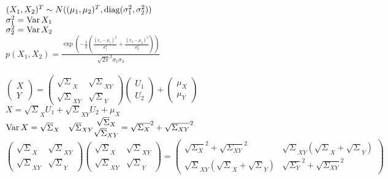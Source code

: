 \documentclass[12pt]{article}
\begin{document}
$(X_1, X_2)^T \sim N((\mu_1, \mu_2)^T, \operatorname{diag}(\sigma_1^2, \sigma_2^2))$\\
$\sigma_1^2 = \operatorname{Var} X_1$\\
$\sigma_2^2 = \operatorname{Var} X_2$\\
$p(X_1, X_2) = \frac{\exp(-\frac12 (\frac{(x_1 - \mu_1)^2}{\sigma_1^2} + \frac{(x_2 - \mu_2)^2}{\sigma_2^2}))}{\sqrt{2\pi}^2 \sigma_1 \sigma_2}$\\\\
$\begin{pmatrix}
    X\\Y
\end{pmatrix} = \begin{pmatrix}
    \sqrt{\Sigma}_X & \sqrt{\Sigma}_{XY}\\
    \sqrt{\Sigma}_{XY} & \sqrt{\Sigma}_Y
\end{pmatrix}\begin{pmatrix}
    U_1\\U_2
\end{pmatrix} + \begin{pmatrix}
    \mu_X\\\mu_Y
\end{pmatrix}$\\
$X = \sqrt{\Sigma}_X U_1 + \sqrt{\Sigma}_{XY}U_2 + \mu_X$\\
$\operatorname{Var} X = \begin{matrix}
    \sqrt{\Sigma}_X & \sqrt{\Sigma}_{XY}
\end{matrix}\begin{matrix}
    \sqrt{\Sigma}_X\\
    \sqrt{\Sigma}_{XY}
\end{matrix} = \sqrt{\Sigma_X}^2 + \sqrt{\Sigma_{XY}}^2$\\
$\begin{pmatrix}
    \sqrt{\Sigma}_X & \sqrt{\Sigma}_{XY}\\
    \sqrt{\Sigma}_{XY} & \sqrt{\Sigma}_Y
\end{pmatrix}\begin{pmatrix}
    \sqrt{\Sigma}_X & \sqrt{\Sigma}_{XY}\\
    \sqrt{\Sigma}_{XY} & \sqrt{\Sigma}_Y
\end{pmatrix} = \begin{pmatrix}
    \sqrt{\Sigma_X}^2 + \sqrt{\Sigma_{XY}}^2 & \sqrt{\Sigma}_{XY}(\sqrt{\Sigma}_X + \sqrt{\Sigma}_Y)\\
    \sqrt{\Sigma}_{XY}(\sqrt{\Sigma}_X + \sqrt{\Sigma}_Y) & \sqrt{\Sigma_Y}^2 + \sqrt{\Sigma_{XY}}^2
\end{pmatrix}$
\end{document}
